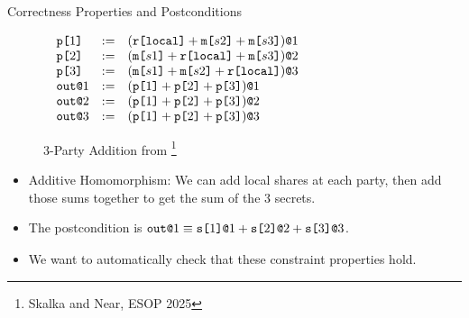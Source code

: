 \documentclass{beamer}
\begin{document}
\begin{frame}{Correctness Properties and Postconditions}
\begin{figure}
    {\footnotesize
    $
    \begin{array}{c@{\qquad}c}
    \begin{array}{llllll}
      \rvl{1} &:=& \elab{(\locflip \fplus \mesg{s2} \fplus \mesg{s3})}{1} \\ 
      \rvl{2} &:=& \elab{(\mesg{s1} \fplus \locflip \fplus \mesg{s3})}{2} \\
      \rvl{3} &:=& \elab{(\mesg{s1} \fplus \mesg{s2} \fplus \locflip)}{3} \\
      \out{1} &:=& \elab{(\rvl{1} \fplus \rvl{2} + \rvl{3})}{1}\\
      \out{2} &:=& \elab{(\rvl{1} \fplus \rvl{2} + \rvl{3})}{2}\\
      \out{3} &:=& \elab{(\rvl{1} \fplus \rvl{2} + \rvl{3})}{3}
    \end{array}
    \end{array}$
    }
    \caption{3-Party Addition from \footnote{Skalka and Near, ESOP 2025}}
    \label{fig-3-party-add}
    \end{figure}
    \begin{itemize}
    \item Additive Homomorphism: We can add local shares at each party, then add those sums together to get the sum of the 3 secrets.
    \item The postcondition is {$\texttt{out}\texttt{@}1 \equiv \texttt{s[}1\texttt{]}\texttt{@}1 + \texttt{s[}2\texttt{]}\texttt{@}2 + \texttt{s[}3\texttt{]}\texttt{@}3\strut$}.
    \item We want to automatically check that these constraint properties hold.
    \end{itemize}

\end{frame}
\end{document}
